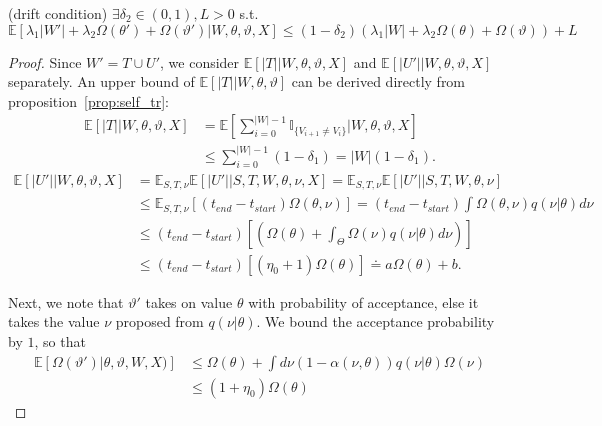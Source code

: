 \begin{lemma}(drift condition) $\exists \delta_2 \in (0, 1), L > 0$ 
  s.t. 
  $\mathbb{E}\left[\lambda_1|W'| + \lambda_2\Omega(\theta')+
  \Omega(\vartheta') | W, \theta, \vartheta, X\right] 
  \leq (1 - \delta_2)\left(\lambda_1|W| + \lambda_2 \Omega(\theta) +
  \Omega(\vartheta)\right) + L$ %
\label{lem:drift}
\end{lemma}
\begin{proof}
Since $W'=T\cup U'$, we consider $\mathbb{E}[|T| |W,\theta,\vartheta,X]$ 
and $\mathbb{E}[|U'| | W, \theta, \vartheta, X]$ separately.
An upper bound of $\mathbb{E}[|T| | W,\theta,\vartheta]$ can be derived
directly from proposition~\ref{prop:self_tr}:
\begin{align*}
\mathbb{E}[|T| |W,\theta,\vartheta,X] &= \mathbb{E}[\sum_{i = 0}^{|W|-1} 
  \mathbb{I}_{\{ V_{i + 1} \neq V_i \}}| W, \theta, \vartheta, X]\\
&\leq \sum_{i = 0}^{|W| - 1} (1 - \delta_1) = |W|(1 - \delta_1).
\end{align*}
\begin{align*}
\mathbb{E}[|U'| |W, \theta, \vartheta, X] &= \mathbb{E}_{S,T, \nu}\mathbb{E}[|U'| | S, T, W, \theta, \nu, X] = \mathbb{E}_{S,T, \nu}\mathbb{E}[|U'| | S, T, W, \theta, \nu] \\
& \leq \mathbb{E}_{S,T, \nu} \left[(t_{end} - t_{start})\Omega(\theta, \nu)\right] = (t_{end} - t_{start})\int \Omega(\theta, \nu) q(\nu | \theta) d\nu\\
& \leq (t_{end} - t_{start})\left[ \left(  \Omega(\theta) +
\int_\Theta \Omega(\nu) q(\nu | \theta)d\nu \right) \right] \\
& \leq (t_{end} - t_{start}) \left[ (\eta_0 + 1) \Omega(\theta) \right] 
\doteq a \Omega(\theta) + b.
\end{align*}

Next, we note that $\vartheta'$ takes on value $\theta$ with 
probability of acceptance, else it takes the value $\nu$ proposed  from
$q(\nu|\theta)$. We bound the acceptance
probability by $1$, so that
\begin{align}
\mathbb{E}[\Omega(\vartheta')|\theta,\vartheta,W,X)] &\le \Omega(\theta)
+ \int d\nu (1-\alpha(\nu,\theta)) q(\nu|\theta) \Omega(\nu)\nonumber \\
  & \le (1+\eta_0) \Omega(\theta)
\end{align}


\end{proof}
